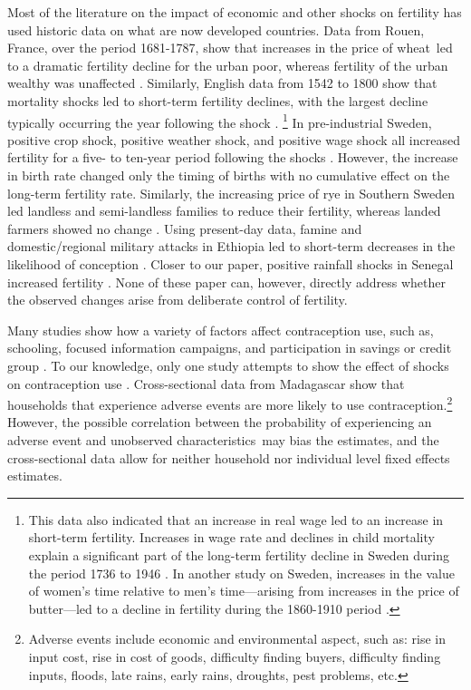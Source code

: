 \documentclass[letterpaper,12pt]{article}
\begin{document}
Most of the literature on the impact of economic and other shocks on fertility 
has used historic data on what are now developed countries.
Data from Rouen, France, over the period 1681-1787, show that increases in the
price of wheat led to a dramatic fertility decline for the urban poor, 
whereas fertility of the urban wealthy was unaffected \citep{Galloway1987}.
Similarly, English data from 1542 to 1800 show that mortality shocks led to short-term
fertility declines, with the largest decline typically occurring  the year following 
the shock \citep{Bailey1998}.%
\footnote{
This data also indicated that an increase in real wage led to an increase in short-term 
fertility.
Increases in wage rate and declines in child mortality explain a significant part of the 
long-term fertility decline in Sweden during the period 1736 to 1946 \citep{Eckstein1999a}.
In another study on Sweden, increases in the value of women's time relative to men's 
time---arising from increases in the price of butter---led to a decline in fertility during 
the  1860-1910 period \citep{Schultz1985}. 
}
In pre-industrial Sweden, positive crop shock, positive weather shock, and 
positive wage shock all increased fertility for a five- to ten-year period following 
the shocks \citep{Eckstein1985}.
However, the increase in birth rate changed only the timing of births with no 
cumulative effect on the long-term fertility rate.
Similarly, the increasing price of rye in Southern Sweden led landless and 
semi-landless families to reduce their fertility, whereas landed farmers 
showed no change \citep{bengtsson06}.
Using present-day data, famine and domestic/regional military attacks in Ethiopia 
led to short-term decreases in the likelihood of conception \citep{lindstrom99}.
Closer to our paper, positive rainfall shocks in Senegal increased 
fertility \citep{pitt98b}.
None of these paper can, however, directly address whether the observed changes 
arise from deliberate control of fertility.

Many studies show how a variety of factors affect contraception use, such 
as, 
schooling, 
focused information campaigns, and
participation in savings or credit group 
\citep{Ainsworth1996,Feyisetan1996,Steele2001,Chen2003}.
To our knowledge, only one study attempts to show the effect of shocks on 
contraception use \citep{Hernandez-Correa2010}. 
Cross-sectional data from Madagascar show that households that experience adverse 
events are more likely to use contraception.\footnote{%
Adverse events include economic and environmental aspect, such as: rise in input 
cost, rise in cost of goods, difficulty finding buyers, difficulty finding inputs, 
floods, late rains, early rains, droughts, pest problems, etc. 
} 
However, 
the possible correlation between the probability of experiencing 
an adverse event and unobserved characteristics may bias the estimates, 
and the cross-sectional data allow for neither household 
nor individual level fixed effects estimates.
\end{document}
